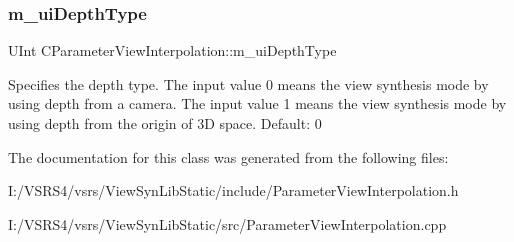 \subsubsection{\texorpdfstring{m\+\_\+ui\+Depth\+Type}{m\_uiDepthType}}
{\footnotesize\ttfamily U\+Int C\+Parameter\+View\+Interpolation\+::m\+\_\+ui\+Depth\+Type\hspace{0.3cm}{\ttfamily [protected]}}

Specifies the depth type. The input value 0 means the view synthesis mode by using depth from a camera. The input value 1 means the view synthesis mode by using depth from the origin of 3D space. Default\+: 0 

The documentation for this class was generated from the following files\+:\begin{DoxyCompactItemize}
\item 
I\+:/\+V\+S\+R\+S4/vsrs/\+View\+Syn\+Lib\+Static/include/Parameter\+View\+Interpolation.\+h\item 
I\+:/\+V\+S\+R\+S4/vsrs/\+View\+Syn\+Lib\+Static/src/Parameter\+View\+Interpolation.\+cpp\end{DoxyCompactItemize}
